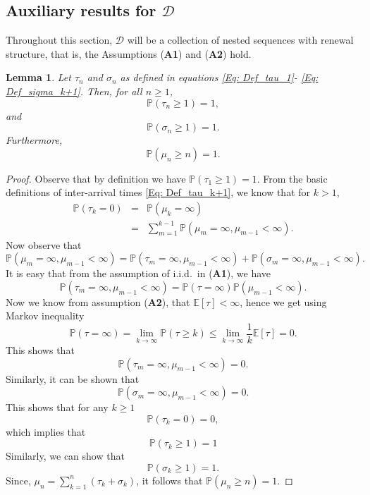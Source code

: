 \documentclass{article}
\numberwithin{equation}{section}
\newtheorem{lemma}[theorem]{Lemma}
\newcommand{\DD}{\mbox{${\mathcal D}$}}
\newcommand{\1}{\mathbf{1}}
\newcommand{\0}{\mathbf{0}}
\newcommand{\PP}{\mbox{${\mathbb P}$}}
\newcommand{\E}{\mbox{${\mathbb E}$}}
\begin{document}
\subsection{Auxiliary results for $\DD$}
\label{SubSubsec: Auxiliary results for the collection D}
Throughout this section, $\DD$ will be a collection of nested sequences with renewal structure, that is, the Assumptions (\textbf{A1}) and (\textbf{A2}) hold.
\begin{lemma}
\label{Lem: tau_sigma_positive}
Let $\tau_n$ and $\sigma_n$ as defined in equations \eqref{Eq: Def_tau_1}- \eqref{Eq: Def_sigma_k+1}. Then, for all $n \ge 1$,
\begin{equation}
\label{Eq: tau_greater_than_1}
\PP \left(\tau_n \ge 1\right)=1,
\end{equation}
and 
\begin{equation}
\label{Eq: sigma_greater_than_1}
\PP \left(\sigma_n \ge 1\right)=1.
\end{equation}
Furthermore, 
\begin{equation}
\label{Eq: mu_greater_than_n}
\PP \left(\mu_n \ge n\right)=1.
\end{equation}
\end{lemma}
\begin{proof}
Observe that by definition we have $\PP\left(\tau_1 \ge  1 \right)=1$.
From the basic definitions of inter-arrival times \eqref{Eq: Def_tau_k+1}, we know that for $k >1$, 
\begin{eqnarray*}
\PP\left(\tau_k= 0\right) 
&= & \PP\left(\mu_k =\infty \right)\\
& = & \sum_{m=1}^{k-1} \PP\left(\mu_m =\infty, \mu_{m-1}< \infty\right).
\end{eqnarray*}
Now observe that 
\[
\PP\left(\mu_m =\infty, \mu_{m-1}< \infty\right)= \PP \left(\tau_{m} = \infty, \mu_{m-1}< \infty\right)+\PP \left(\sigma_{m} = \infty, \mu_{m-1}< \infty\right).
\]
It is easy that from the assumption of i.i.d.\ in (\textbf{A1}), we have 
\begin{equation*}
\PP \left(\tau_{m} = \infty, \mu_{m-1}< \infty\right)
= \PP \left(\tau= \infty\right) \PP \left(\mu_{m-1}< \infty\right).
\end{equation*}
Now we know from assumption (\textbf{A2}), that $\E \left[\tau \right] <\infty$, hence we get using Markov inequality 
\begin{equation*}
\PP \left(\tau= \infty\right)=\lim_{k \to \infty}\PP \left(\tau \ge k \right)\le \lim_{k \to \infty} \frac{1}{k} \E \left[\tau \right] =0.
\end{equation*}
This shows that
\[
\PP \left(\tau_{m} = \infty, \mu_{m-1}< \infty\right)=0.
\]
Similarly, it can be shown that 
\[
\PP \left(\sigma_{m} = \infty, \mu_{m-1}< \infty\right)=0.
\]
This shows that for any $k \ge 1$
\[
\PP\left(\tau_k= 0 \right) =0,
\]
which implies that 
\[
\PP\left(\tau_k \ge 1\right)=1
\]
Similarly, we can show that 
\[
\PP\left(\sigma_k \ge 1\right) =1.
\]
Since, $\mu_n = \sum_{k=1}^n (\tau_k+\sigma_k)$, it follows that $\PP \left(\mu_n \ge n \right)=1$.
\end{proof}
\end{document}
